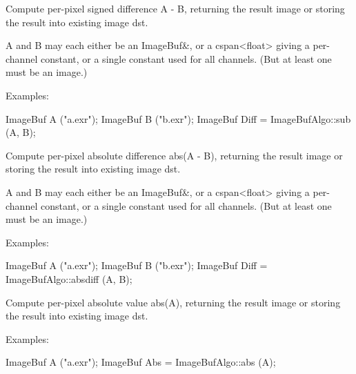 Compute per-pixel signed difference {\cf A - B}, returning the result image
or storing the result into existing image {\cf dst}.

{\cf A} and {\cf B} may each either be an {\cf ImageBuf\&}, or a
{\cf cspan<float>} giving a per-channel constant, or a single constant used
for all channels. (But at least one must be an image.)

\smallskip
\noindent Examples:
\begin{code}
    ImageBuf A ("a.exr");
    ImageBuf B ("b.exr");
    ImageBuf Diff = ImageBufAlgo::sub (A, B);
\end{code}
\apiend


 

Compute per-pixel absolute difference {\cf abs(A - B)}, returning the result image
or storing the result into existing image {\cf dst}.

{\cf A} and {\cf B} may each either be an {\cf ImageBuf\&}, or a
{\cf cspan<float>} giving a per-channel constant, or a single constant used
for all channels. (But at least one must be an image.)

\smallskip
\noindent Examples:
\begin{code}
    ImageBuf A ("a.exr");
    ImageBuf B ("b.exr");
    ImageBuf Diff = ImageBufAlgo::absdiff (A, B);
\end{code}
\apiend


 

Compute per-pixel absolute value {\cf abs(A)}, returning the result image
or storing the result into existing image {\cf dst}.

\smallskip
\noindent Examples:
\begin{code}
    ImageBuf A ("a.exr");
    ImageBuf Abs = ImageBufAlgo::abs (A);
\end{code}
\apiend



 

